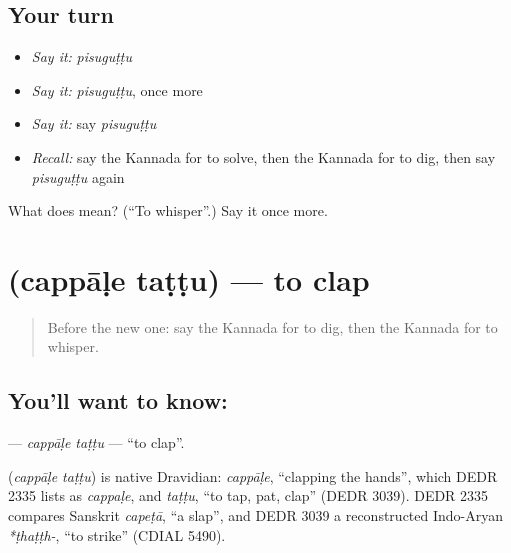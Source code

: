 \subsection*{Your turn}
\begin{itemize}
\raggedright
  \item \emph{Say it:} \emph{pisuguṭṭu}
  \item \emph{Say it:} \emph{pisuguṭṭu}, once more
  \item \emph{Say it:} say \emph{pisuguṭṭu}
  \item \emph{Recall:} say the Kannada for to solve, then the Kannada for to dig, then say \emph{pisuguṭṭu} again
\end{itemize}

\begin{tcolorbox}[breakable,colback=teal!4,colframe=teal!35!black,title={Before you move on}]
What does  mean? (\textquotedblleft{}To whisper\textquotedblright{}.) Say it once more.
\end{tcolorbox}
\section[\texorpdfstring{\kn{ಚಪ್ಪಾಳೆ} \kn{ತಟ್ಟು} (cappāḷe taṭṭu)}{ಚಪ್ಪಾಳೆ ತಟ್ಟು (cappāḷe taṭṭu)}]{  (cappāḷe taṭṭu) — to clap}

\label{lesson:KA-C280-cappale-tattu}



\begin{quote}
Before the new one: say the Kannada for to dig, then the Kannada for to whisper.
\end{quote}

\subsection*{You'll want to know:  }
\textbf{ } — \emph{cappāḷe taṭṭu} — \textquotedblleft{}to clap\textquotedblright{}.

\begin{cousinweb}
\textbf{ } (\emph{cappāḷe taṭṭu}) is native Dravidian: \emph{cappāḷe}, \textquotedblleft{}clapping the hands\textquotedblright{}, which DEDR 2335 lists as \emph{cappaḷe}, and \emph{taṭṭu}, \textquotedblleft{}to tap, pat, clap\textquotedblright{} (DEDR 3039). DEDR 2335 compares Sanskrit \emph{capeṭā}, \textquotedblleft{}a slap\textquotedblright{}, and DEDR 3039 a reconstructed Indo-Aryan \emph{*ṭhaṭṭh-}, \textquotedblleft{}to strike\textquotedblright{} (CDIAL 5490).
\end{cousinweb}

